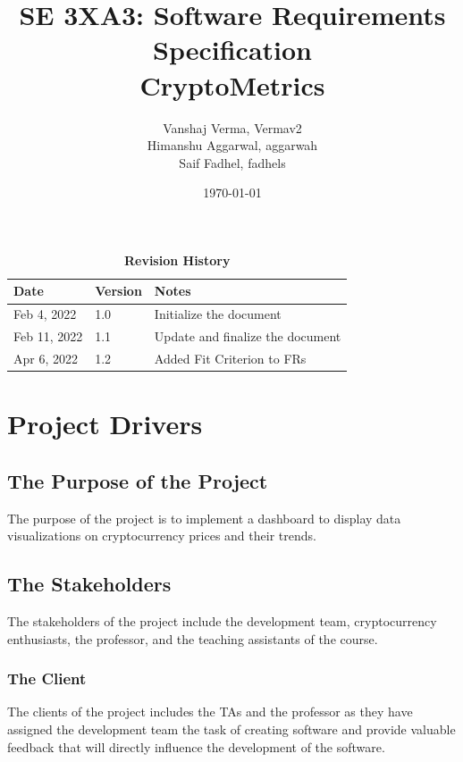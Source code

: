 \documentclass[12pt, titlepage]{article}
\title{SE 3XA3: Software Requirements Specification \\ CryptoMetrics}
\author{Vanshaj Verma, Vermav2
		\\ Himanshu Aggarwal, aggarwah
		\\ Saif Fadhel, fadhels
}
\date{\today}
\begin{document}
\maketitle

\tableofcontents
\listoftables
\listoffigures

\begin{table}[bp]
\caption{\bf Revision History}
\begin{tabularx}{\textwidth}{p{3cm}p{2cm}X}
\toprule {\bf Date} & {\bf Version} & {\bf Notes}\\
\midrule
Feb 4, 2022 & 1.0 & Initialize the document \\
Feb 11, 2022 & 1.1 & Update and finalize the document \\
Apr 6, 2022 & 1.2 & Added Fit Criterion to FRs \\
\bottomrule
\end{tabularx}
\end{table}

\newpage


\section{Project Drivers}

\subsection{The Purpose of the Project}
The purpose of the project is to implement a dashboard to display data visualizations on cryptocurrency prices and their trends.

\subsection{The Stakeholders}

The stakeholders of the project include the development team, cryptocurrency enthusiasts, the professor, and the teaching assistants of the course. 

\subsubsection{The Client}

The clients of the project includes the TAs and the professor as they have assigned the development team the task of creating software and provide valuable feedback that will directly influence the development of the software.
\end{document}
